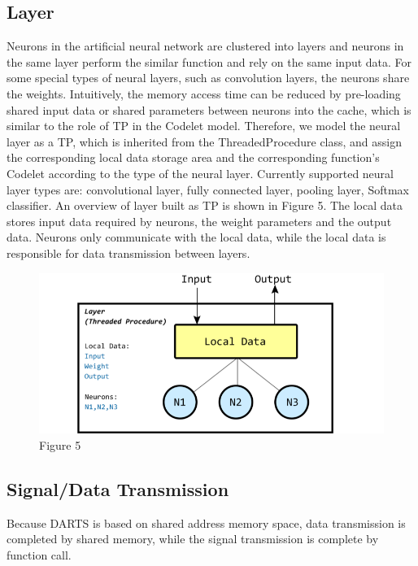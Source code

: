 \subsection{Layer}
Neurons in the artificial neural network are clustered into layers and neurons in the same layer perform the similar function and rely on the same input data. For some special types of neural layers, such as convolution layers, the neurons share the weights. Intuitively, the memory access time can be reduced by pre-loading shared input data or shared parameters between neurons into the cache, which is similar to the role of TP in the Codelet model. Therefore, we model the neural layer as a TP, which is inherited from the ThreadedProcedure class, and assign the corresponding local data storage area and the corresponding function's Codelet according to the type of the neural layer. Currently supported neural layer types are: convolutional layer, fully connected layer, pooling layer, Softmax classifier. An overview of layer built as TP is shown in Figure 5. The local data stores input data required by neurons, the weight parameters and the output data. Neurons only communicate with the local data, while the local data is responsible for data transmission between layers.
 
\begin{figure}[h]
\caption{Figure 5}
\centering
\includegraphics[width=1\textwidth]{Fig/figure5.png}
\end{figure}

\subsection{Signal/Data Transmission}
Because DARTS is based on shared address memory space, data transmission is completed by shared memory, while the signal transmission is complete by function call.
 
